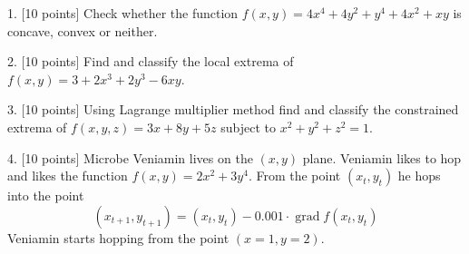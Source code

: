 \documentclass[12pt,a4paper]{article}
\DeclareMathOperator{\grad}{grad}
\begin{document}
\newpage
{}
\setcounter{page}{1}

1. {[10 points]} Check whether the function $f(x,y)= 4x^4 + 4y^2+y^4+4x^2+xy$ is concave, convex or neither.

\newpage
{}

2. {[10 points]} Find and classify the local extrema of $f(x,y) = 3 + 2x^3 + 2y^3 - 6xy$.

\newpage
{}

3. {[10 points]} Using Lagrange multiplier method find and classify the constrained extrema of $f(x, y, z) =  3x +8y + 5z$ subject to $x^2 + y^2 + z^2 = 1$.




\newpage
{}

4. {[10 points]} Microbe Veniamin lives on the $(x, y)$ plane. Veniamin likes to hop and likes the function $f(x, y) = 2x^2 + 3y^4$. From the point $(x_t, y_t)$ he hops into the point
\[
(x_{t+1},y_{t+1})=(x_t, y_t) - 0.001\cdot \grad f(x_t, y_t)
\]
Veniamin starts hopping from the point $(x=1, y =2)$.
\end{document}
